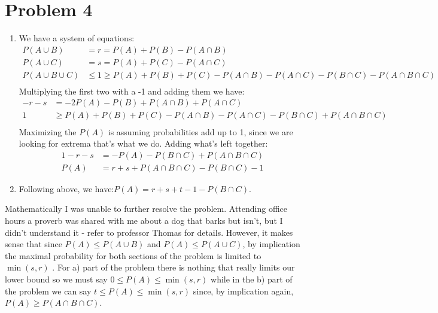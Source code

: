 \documentclass{article}
\newcommand{\1}{\mathbf{1}}
\begin{document}
\newpage
\section*{Problem 4}
\begin{enumerate} 
    \item We have a system of equations:
    \begin{align*}
    P(A\cup B) &= r = P(A) + P(B) - P(A\cap B) \\
    P(A\cup C) &= s = P(A) + P(C) - P(A\cap C) \\
    P(A\cup B\cup C) &\leq 1 \geq P(A) + P(B) + P(C) - P(A\cap B) - P(A\cap C) - P(B \cap C) - P(A\cap B \cap C) \\
    \end{align*}
    Multiplying the first two with a -1 and adding them we have:
    \begin{align*}
    -r - s &= -2P(A) - P(B) + P(A\cap B) + P(A\cap C) \\
    1 &\geq P(A) + P(B) + P(C) - P(A\cap B) - P(A\cap C) - P(B \cap C) + P(A\cap B \cap C) \\
    \end{align*}
    Maximizing the $P(A)$ is assuming probabilities add up to 1, since we are looking for extrema that's what we do. Adding what's left together:
    \begin{align*}
    1-r-s &= -P(A) - P(B \cap C) + P(A\cap B \cap C) \\
    P(A) &= r + s + P(A\cap B \cap C) - P(B \cap C) - 1
    \end{align*}
    \item Following above, we have:$ P(A) = r + s + t -1 - P(B \cap C)$.
\end{enumerate}

Mathematically I was unable to further resolve the problem. Attending office hours a proverb was shared with me about a dog that barks but isn't, but I didn't understand it - refer to professor Thomas for details. However, it makes sense that since  $P(A) \leq P(A\cup B)$ and $P(A) \leq P(A\cup C)$, by implication the maximal probability for both sections of the problem is limited to $\min{(s, r)}$ . For a) part of the problem there is nothing that really limits our lower bound so we must say $0 \leq P(A) \leq \min{(s, r)}$ while in the b) part of the problem we can say $t \leq P(A) \leq \min{(s, r)}$ since, by implication again, $P(A)\geq P(A\cap B\cap C)$.

\newpage
\end{document}
